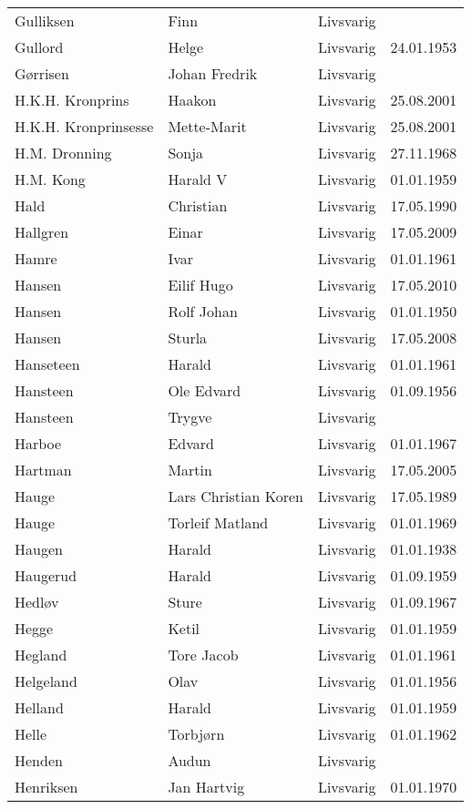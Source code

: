 \begin{longtable}{llll}
Gulliksen	&	Finn	&	Livsvarig 	&		\\
Gullord	&	Helge	&	Livsvarig 	&	24.01.1953	\\
Gørrisen	&	Johan Fredrik	&	Livsvarig 	&		\\
H.K.H. Kronprins	&	Haakon 	&	Livsvarig	&	25.08.2001	\\
H.K.H. Kronprinsesse	&	Mette-Marit 	&	Livsvarig	&	25.08.2001	\\
H.M. Dronning	&	Sonja	&	Livsvarig 	&	27.11.1968	\\
H.M. Kong	&	Harald V	&	Livsvarig 	&	01.01.1959	\\
Hald	&	Christian	&	Livsvarig 	&	17.05.1990	\\
Hallgren	&	Einar	&	Livsvarig	&	17.05.2009	\\
Hamre	&	Ivar	&	Livsvarig 	&	01.01.1961	\\
Hansen	&	Eilif Hugo	&	Livsvarig	&	17.05.2010	\\
Hansen	&	Rolf Johan	&	Livsvarig 	&	01.01.1950	\\
Hansen	&	Sturla	&	Livsvarig	&	17.05.2008	\\
Hanseteen	&	Harald	&	Livsvarig 	&	01.01.1961	\\
Hansteen	&	Ole Edvard	&	Livsvarig 	&	01.09.1956	\\
Hansteen	&	Trygve	&	Livsvarig 	&		\\
Harboe	&	Edvard	&	Livsvarig 	&	01.01.1967	\\
Hartman 	&	Martin	&	Livsvarig	&	17.05.2005	\\
Hauge	&	Lars Christian Koren	&	Livsvarig 	&	17.05.1989	\\
Hauge	&	Torleif Matland	&	Livsvarig 	&	01.01.1969	\\
Haugen	&	Harald	&	Livsvarig 	&	01.01.1938	\\
Haugerud	&	Harald	&	Livsvarig 	&	01.09.1959	\\
Hedløv	&	Sture	&	Livsvarig 	&	01.09.1967	\\
Hegge	&	Ketil	&	Livsvarig 	&	01.01.1959	\\
Hegland	&	Tore Jacob	&	Livsvarig 	&	01.01.1961	\\
Helgeland	&	Olav	&	Livsvarig 	&	01.01.1956	\\
Helland	&	Harald	&	Livsvarig 	&	01.01.1959	\\
Helle	&	Torbjørn	&	Livsvarig 	&	01.01.1962	\\
Henden	&	Audun	&	Livsvarig 	&		\\
Henriksen	&	Jan Hartvig	&	Livsvarig 	&	01.01.1970	\\

\end{longtable}
